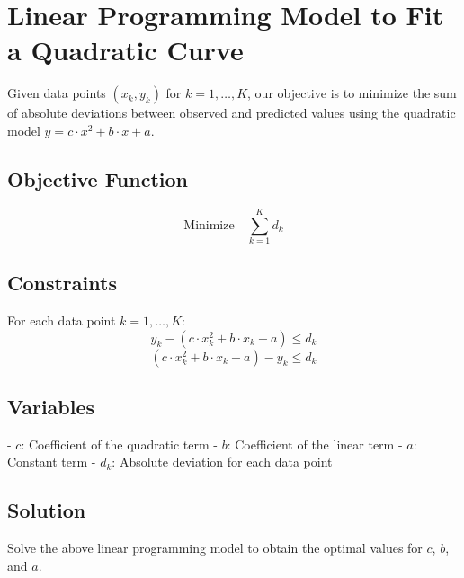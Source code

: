 \documentclass{article}
\begin{document}
\section*{Linear Programming Model to Fit a Quadratic Curve}

Given data points \((x_k, y_k)\) for \(k = 1, \ldots, K\), our objective is to minimize the sum of absolute deviations between observed and predicted values using the quadratic model \(y = c \cdot x^2 + b \cdot x + a\).

\subsection*{Objective Function}
\[
\text{Minimize} \quad \sum_{k=1}^{K} d_k
\]

\subsection*{Constraints}
For each data point \(k = 1, \ldots, K\):
\[
y_k - (c \cdot x_k^2 + b \cdot x_k + a) \leq d_k 
\]
\[
(c \cdot x_k^2 + b \cdot x_k + a) - y_k \leq d_k 
\]

\subsection*{Variables}
- \(c\): Coefficient of the quadratic term
- \(b\): Coefficient of the linear term
- \(a\): Constant term
- \(d_k\): Absolute deviation for each data point

\subsection*{Solution}
Solve the above linear programming model to obtain the optimal values for \(c\), \(b\), and \(a\).
\end{document}

